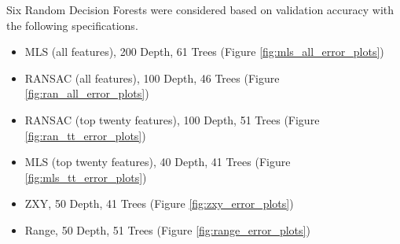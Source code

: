 \documentclass[numbered,pdftex]{ohio-etd}
\begin{document}
{		{Six Random Decision Forests were considered based on validation accuracy with the following specifications.}
		
		\begin{itemize}[itemsep=1pt]
			\item MLS (all features), 200 Depth, 61 Trees (Figure \ref{fig:mls_all_error_plots})
			\item RANSAC (all features), 100 Depth, 46 Trees (Figure \ref{fig:ran_all_error_plots})
			\item RANSAC (top twenty features), 100 Depth, 51 Trees (Figure \ref{fig:ran_tt_error_plots})
			\item MLS (top twenty features), 40 Depth, 41 Trees (Figure \ref{fig:mls_tt_error_plots})
			\item ZXY, 50 Depth, 41 Trees (Figure \ref{fig:zxy_error_plots})
			\item Range, 50 Depth, 51 Trees (Figure \ref{fig:range_error_plots})
		\end{itemize}
		
%	
	
		\begin{figure}[H]
		
			

\end{figure}}
\end{document}
